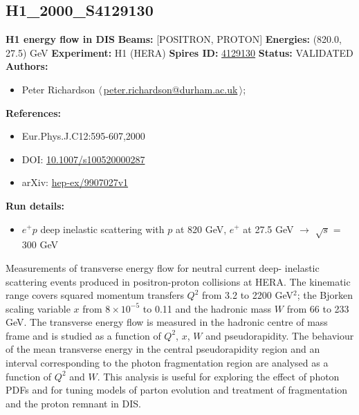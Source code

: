 \subsection[H1\_2000\_S4129130]{H1\_2000\_S4129130\,\cite{Adloff:1999ws}}
\textbf{H1 energy flow in DIS}\newline
\textbf{Beams:} [POSITRON, PROTON] \newline
\textbf{Energies:} (820.0, 27.5) GeV \newline
\textbf{Experiment:} H1 (HERA) \newline
\textbf{Spires ID:} \href{http://www.slac.stanford.edu/spires/find/hep/www?rawcmd=key+4129130}{4129130}\newline
\textbf{Status:} VALIDATED\newline
\textbf{Authors:}
\begin{itemize}
  \item Peter Richardson $\langle\,$\href{mailto:peter.richardson@durham.ac.uk}{peter.richardson@durham.ac.uk}$\,\rangle$;
\end{itemize}
\textbf{References:}
\begin{itemize}
  \item Eur.Phys.J.C12:595-607,2000
  \item DOI: \href{http://dx.doi.org/10.1007/s100520000287}{10.1007/s100520000287}
  \item arXiv: \href{http://arxiv.org/abs/hep-ex/9907027v1}{hep-ex/9907027v1}
\end{itemize}
\textbf{Run details:}
\begin{itemize}

  \item $e^+ p$ deep inelastic scattering with $p$ at 820 GeV, $e^+$ at 27.5 GeV \ensuremath{\to} \ensuremath{\sqrt{s}} = 300 GeV\end{itemize}

\noindent Measurements of transverse energy flow for neutral current deep- inelastic scattering events produced in positron-proton collisions at HERA. The kinematic range covers squared momentum transfers $Q^2$ from 3.2 to 2200 GeV$^2$; the Bjorken scaling variable $x$ from $8 \times 10^{-5}$ to 0.11 and the hadronic mass $W$ from 66 to 233 GeV. The transverse energy flow is measured in the hadronic centre of mass frame and is studied as a function of $Q^2$, $x$, $W$ and pseudorapidity. The behaviour of the mean transverse energy in the central pseudorapidity region and an interval corresponding to the photon fragmentation region are analysed as a function of $Q^2$ and $W$.  This analysis is useful for exploring the effect of photon PDFs and for tuning models of parton evolution and treatment of fragmentation and the proton remnant in DIS.


